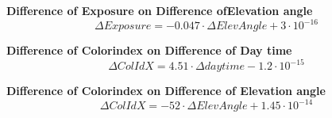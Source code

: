 \documentclass  [
  paper    = a4,
  BCOR     = 10mm,
  twoside,
  fontsize = 12pt,
  fleqn,
  toc      = bibnumbered,
  toc      = listofnumbered,
  numbers  = noendperiod,
  headings = normal,
  listof   = leveldown,
  version  = 3.03
]                                       {scrreprt}
\begin{document}
						\textbf{Difference of  Exposure  on  Difference ofElevation angle}
		\begin{equation}
		\Delta Exposure  =-0.047\cdot \Delta  ElevAngle +3\cdot 10^{-16}
		\end{equation}


		\textbf{Difference of  Colorindex  on  Difference of Day time}
		\begin{equation}
		\Delta ColIdX  =4.51\cdot \Delta daytime-1.2\cdot 10^{-15}
		\end{equation}
		
		\textbf{Difference of  Colorindex  on  Difference of Elevation angle}
		\begin{equation}
		\Delta ColIdX  =-52\cdot \Delta ElevAngle+ 1.45\cdot 10^{-14}
		\end{equation}
		
\end{document}
